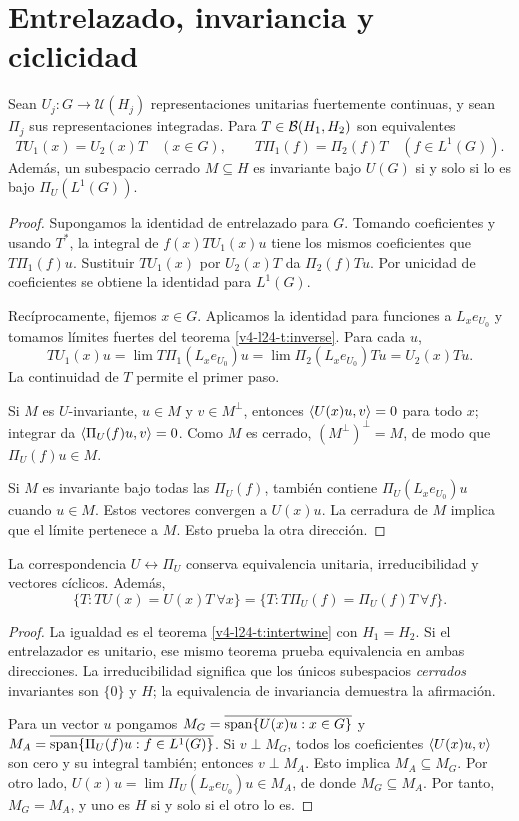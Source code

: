 \section{Entrelazado, invariancia y ciclicidad}
\begin{teorema}\label{v4-l24-t:intertwine}
Sean $U_j:G\to\mathcal U(H_j)$ representaciones unitarias fuertemente continuas, y sean $\Pi_j$ sus representaciones integradas. Para $T\in\mathcal B(H_1,H_2)$ son equivalentes
\[
TU_1(x)=U_2(x)T\quad(x\in G),
\qquad T\Pi_1(f)=\Pi_2(f)T\quad(f\in L^1(G)).
\]
Además, un subespacio cerrado $M\subseteq H$ es invariante bajo $U(G)$ si y solo si lo es bajo $\Pi_U(L^1(G))$.
\end{teorema}
\begin{proof}
Supongamos la identidad de entrelazado para $G$. Tomando coeficientes y usando $T^*$, la integral de $f(x)TU_1(x)u$ tiene los mismos coeficientes que $T\Pi_1(f)u$. Sustituir $TU_1(x)$ por $U_2(x)T$ da $\Pi_2(f)Tu$. Por unicidad de coeficientes se obtiene la identidad para $L^1(G)$.

Recíprocamente, fijemos $x\in G$. Aplicamos la identidad para funciones a $L_xe_{U_0}$ y tomamos límites fuertes del teorema \ref{v4-l24-t:inverse}. Para cada $u$,
\[
TU_1(x)u=\lim T\Pi_1(L_xe_{U_0})u
=\lim\Pi_2(L_xe_{U_0})Tu=U_2(x)Tu.
\]
La continuidad de $T$ permite el primer paso.

Si $M$ es $U$-invariante, $u\in M$ y $v\in M^\perp$, entonces $\left\langle U(x)u,v\right\rangle=0$ para todo $x$; integrar da $\left\langle\Pi_U(f)u,v\right\rangle=0$. Como $M$ es cerrado, $(M^\perp)^\perp=M$, de modo que $\Pi_U(f)u\in M$.

Si $M$ es invariante bajo todas las $\Pi_U(f)$, también contiene $\Pi_U(L_xe_{U_0})u$ cuando $u\in M$. Estos vectores convergen a $U(x)u$. La cerradura de $M$ implica que el límite pertenece a $M$. Esto prueba la otra dirección.
\end{proof}

\begin{corolario}\label{v4-l24-c:invariants}
La correspondencia $U\leftrightarrow\Pi_U$ conserva equivalencia unitaria, irreducibilidad y vectores cíclicos. Además,
\[
\{T:TU(x)=U(x)T\ \forall x\}
=\{T:T\Pi_U(f)=\Pi_U(f)T\ \forall f\}.
\]
\end{corolario}
\begin{proof}
La igualdad es el teorema \ref{v4-l24-t:intertwine} con $H_1=H_2$. Si el entrelazador es unitario, ese mismo teorema prueba equivalencia en ambas direcciones. La irreducibilidad significa que los únicos subespacios \emph{cerrados} invariantes son $\{0\}$ y $H$; la equivalencia de invariancia demuestra la afirmación.

Para un vector $u$ pongamos $M_G=\overline{\operatorname{span}\{U(x)u:x\in G\}}$ y $M_A=\overline{\operatorname{span}\{\Pi_U(f)u:f\in L^1(G)\}}$. Si $v\perp M_G$, todos los coeficientes $\left\langle U(x)u,v\right\rangle$ son cero y su integral también; entonces $v\perp M_A$. Esto implica $M_A\subseteq M_G$. Por otro lado, $U(x)u=\lim\Pi_U(L_xe_{U_0})u\in M_A$, de donde $M_G\subseteq M_A$. Por tanto, $M_G=M_A$, y uno es $H$ si y solo si el otro lo es.
\end{proof}

